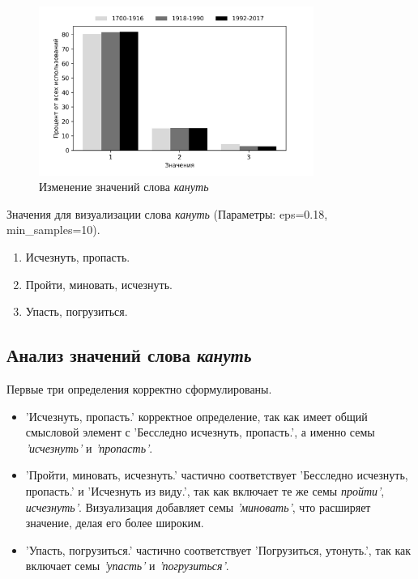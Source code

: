 \begin{figure}[H]
	\centering
	\includegraphics[width=0.8\textwidth]{img/visualizations/kanut'_minimal}
	\caption{Изменение значений слова \textit{кануть}}
	\label{fig:Кануть}
\end{figure}

Значения для визуализации слова \textit{кануть} (Параметры: eps=0.18, min\_samples=10).

\begin{enumerate}
    \item Исчезнуть, пропасть.
    \item Пройти, миновать, исчезнуть.
    \item Упасть, погрузиться.
\end{enumerate}

\subsection*{Анализ значений слова \textit{кануть}}

Первые три определения корректно сформулированы.

\begin{itemize}
    \item ’Исчезнуть, пропасть.’ корректное определение, так как имеет общий смысловой элемент с
’Бесследно исчезнуть, пропасть.’, а именно семы \textit{’исчезнуть’} и \textit{’пропасть’}.

    \item ’Пройти, миновать, исчезнуть.’ частично соответствует
’Бесследно исчезнуть, пропасть.’ и ’Исчезнуть из виду.’, так как включает те же семы \textit{пройти’}, \textit{исчезнуть’}.
Визуализация добавляет семы \textit{’миновать’}, что расширяет значение, делая его более широким.

    \item ’Упасть, погрузиться.’ частично соответствует ’Погрузиться, утонуть.’,
так как включает семы \textit{’упасть’} и \textit{’погрузиться’}.
\end{itemize}

